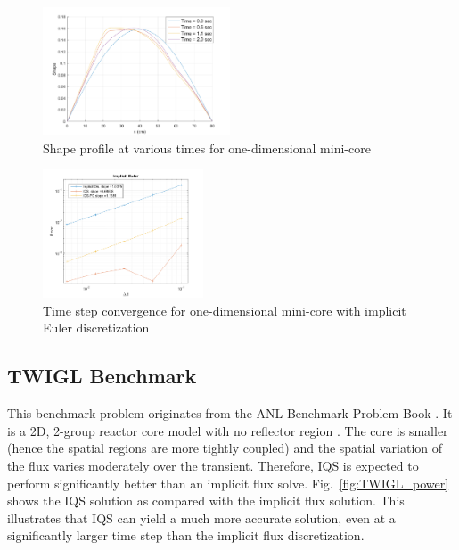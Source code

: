\documentclass{elsarticle}
\newcommand{\fig}[1]{Fig.~\ref{#1}}                      %
\begin{document}
\begin{figure}[!htbp]
\centering
\includegraphics[height=1.5in]{figures/1Dmini_shape.png}
\caption{Shape profile at various times for one-dimensional mini-core}
\label{fig:1Dmini_shape}
\end{figure}

\begin{figure}[!htbp]
\centering
\includegraphics[height=1.5in]{figures/1Dmini_conv_IE.png}
\caption{Time step convergence for one-dimensional mini-core with implicit Euler discretization}
\label{fig:1Dmini_conv}
\end{figure}

\subsection{TWIGL Benchmark}

This benchmark problem originates from the ANL Benchmark Problem Book \cite{ANL_BPB}.  It is a 2D, 2-group reactor core model with no reflector region \cite{TWIGL_benchmark}.  
The core is smaller (hence the spatial regions are more tightly coupled) and the spatial variation of the flux
varies moderately over the transient. 
Therefore, IQS is expected to perform significantly better than an implicit flux solve. \fig{fig:TWIGL_power} shows the IQS  solution as compared with the implicit flux solution. This illustrates that IQS can yield a much more accurate solution, even at a significantly larger time step than the implicit flux discretization.
\end{document}
